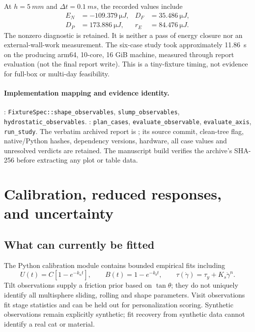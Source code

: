 At $h=\SI{5}{mm}$ and $\Delta t=\SI{0.1}{ms}$, the recorded values include
\begin{align}
 E_N&=-\SI{109.379}{\micro J}, &D_F&=\SI{35.486}{\micro J},\\
 D_P&=\SI{173.886}{\micro J}, &r_E&=\SI{84.476}{\micro J}.
\end{align}
The nonzero diagnostic is retained. It is neither a pass of energy closure nor
an external-wall-work measurement. The six-case study took approximately
\SI{11.86}{s} on the producing arm64, 10-core, 16 GiB machine, measured through
report evaluation (not the final report write). This is a tiny-fixture timing,
not evidence for full-box or multi-day feasibility.

\paragraph{Implementation mapping and evidence identity.}
: \nolinkurl{FixtureSpec::shape_observables},
\nolinkurl{slump_observables}, \nolinkurl{hydrostatic_observables}.
: \nolinkurl{plan_cases},
\nolinkurl{evaluate_observable}, \nolinkurl{evaluate_axis}, \nolinkurl{run_study}.
The verbatim archived report is ;
its source commit, clean-tree flag, native/Python hashes, dependency versions,
hardware, all case values and unresolved verdicts are retained. The manuscript
build verifies the archive's SHA-256 before extracting any plot or table data.

\section{Calibration, reduced responses, and uncertainty}
\label{sec:calibration}
\subsection{What can currently be fitted}
The Python calibration module contains bounded empirical fits including
\begin{equation}
 U(t)=C[1-e^{-k_ut}],\qquad B(t)=1-e^{-k_bt},\qquad
 \tau(\dot\gamma)=\tau_y+K_s\dot\gamma^n.
\end{equation}
Tilt observations supply a friction prior based on $\tan\theta$; they do not
uniquely identify all multisphere sliding, rolling and shape parameters.
Visit observations fit stage statistics and can be held out for personalization
scoring. Synthetic observations remain explicitly synthetic; fit recovery from
synthetic data cannot identify a real cat or material.

